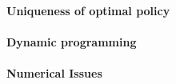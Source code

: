 \paragraph{Uniqueness of optimal policy}
\paragraph{Dynamic programming}
\paragraph{Numerical Issues}
